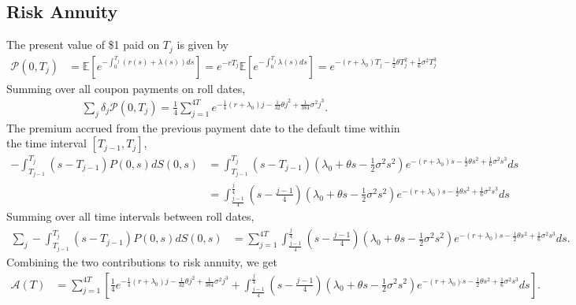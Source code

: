 \documentclass[paper=a4, fontsize=11pt]{scrartcl} %
\numberwithin{equation}{section} %
\numberwithin{figure}{section} %
\numberwithin{table}{section} %
\begin{document}
\subsection{Risk Annuity}
The present value of \$1 paid on $T_j$ is given by
\begin{align}
\nonumber \mathcal{P}(0,T_j) &=  \mathbb{E}\left[ e^{-\int_0^{T_j}\left(r(s)+\lambda(s)\right)ds}\right]
= e^{-rT_j}\mathbb{E}\left[ e^{-\int_0^{T_j}\lambda(s)ds}\right] = e^{- (r+\lambda_0 )T_j - \frac{1}{2}\theta T_j^2 +\frac{1}{6}\sigma^2 T_j^3 }
\end{align}
Summing over all coupon payments on roll dates,
\begin{align}
\nonumber \sum_{j}\delta_j \mathcal{P}(0,T_j)
= \frac{1}{4}\sum_{j=1}^{4T} e^{- \frac{1}{4}(r+\lambda_0)
j - \frac{1}{32}\theta j^2 +\frac{1}{384}\sigma^2 j^3 }.
\end{align}
The premium accrued from the previous payment date to the default time within the time interval $[T_{j-1},T_j]$,
\begin{align}
\nonumber -\int_{T_{j-1}}^{T_j} (s-T_{j-1}) P(0,s)dS(0,s)
&= \int_{T_{j-1}}^{T_j} \left(s-T_{j-1}\right) \left(\lambda_0 + \theta s -\frac{1}{2}\sigma^2 s^2\right) e^{-(r+\lambda_0)s - \frac{1}{2}\theta s^2 + \frac{1}{6}\sigma^2 s^3} ds\\
\nonumber &= \int_{\frac{j-1}{4}}^{\frac{j}{4}} \left(s-\frac{j-1}{4}\right) \left(\lambda_0 + \theta s -\frac{1}{2}\sigma^2 s^2\right) e^{-(r+\lambda_0)s - \frac{1}{2}\theta s^2 + \frac{1}{6}\sigma^2 s^3} ds
\end{align}
Summing over all time intervals between roll dates,
\begin{align}
\nonumber \sum_{j}-\int_{T_{j-1}}^{T_j} (s-T_{j-1}) P(0,s)dS(0,s)
&= \sum_{j=1}^{4T} \int_{\frac{j-1}{4}}^{\frac{j}{4}} \left(s-\frac{j-1}{4}\right) \left(\lambda_0 + \theta s -\frac{1}{2}\sigma^2 s^2\right) e^{-(r+\lambda_0)s - \frac{1}{2}\theta s^2 + \frac{1}{6}\sigma^2 s^3} ds.
\end{align}
Combining the two contributions to risk annuity, we get
\begin{align}
\nonumber \mathcal{A}(T) &= \sum_{j=1}^{4T} \left[\frac{1}{4}e^{- \frac{1}{4}(r+\lambda_0)
j - \frac{1}{32}\theta j^2 +\frac{1}{384}\sigma^2 j^3 } + \int_{\frac{j-1}{4}}^{\frac{j}{4}} \left(s-\frac{j-1}{4}\right) \left(\lambda_0 + \theta s -\frac{1}{2}\sigma^2 s^2\right) e^{-(r+\lambda_0)s - \frac{1}{2}\theta s^2 + \frac{1}{6}\sigma^2 s^3} ds\right].
\end{align}
\end{document}
